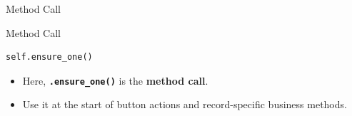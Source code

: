 \begin{frame}[fragile]{Method Call}
\begin{block}{Method Call}
\begin{lstlisting}
self.ensure_one()
\end{lstlisting}
	\begin{itemize}
		\item Here, \textbf{\texttt{.ensure\_one()}} is the \textbf{method call}.
		\item Use it at the start of button actions and record-specific business methods.
	\end{itemize}
\end{block}
\end{frame}
